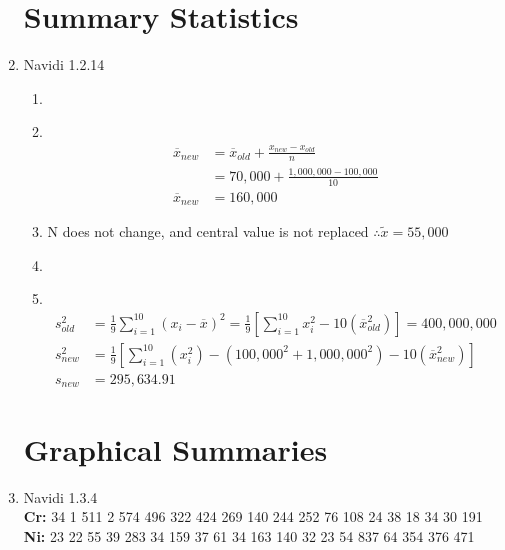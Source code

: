 \documentclass[11pt]{article}
\newcommand\Item[1][]{%
  \ifx\relax#1\relax  \item \else \item[#1] \fi
  \abovedisplayskip=0pt\abovedisplayshortskip=0pt~\vspace*{-\baselineskip}}
\begin{document}
\begin{enumerate}
              \section*{Summary Statistics}
        \item Navidi 1.2.14
              \begin{enumerate}
                      \Item
                      \begin{align*}
                              \overline{x}_{new} & = \overline{x}_{old} + \frac{x_{new} - x_{old}}{n} \\
                                                 & = 70,000 + \frac{1,000,000 - 100,000}{10}          \\
                              \overline{x}_{new} & = 160,000
                      \end{align*}
                      \item  N does not change, and central value is not replaced $\therefore \tilde{x} = 55,000$
                            \Item
                            \begin{align*}
                                    s^{2}_{old} & = \frac{1}{9} \sum_{i=1}^{10}(x_{i} - \overline{x})^{2} = \frac{1}{9} [\sum_{i=1}^{10}x_{i}^{2} - 10(\overline{x}^2_{old})] = 400,000,000 \\
                                    s^{2}_{new} & =  \frac{1}{9} [\sum_{i=1}^{10}(x_{i}^{2})-(100,000^{2}+1,000,000^{2}) - 10(\overline{x}^2_{new})]                                        \\
                                    s_{new}     & = 295,634.91
                            \end{align*}
              \end{enumerate}

              \newpage
              \section*{Graphical Summaries}
        \item Navidi 1.3.4 \\
              \textbf{Cr:} 34 1 511 2 574 496 322 424 269 140 244 252 76 108 24 38 18 34 30 191\\
              \textbf{Ni:} 23 22 55 39 283 34 159 37 61 34 163 140 32 23 54 837 64 354 376 471


\end{enumerate}
\end{document}
